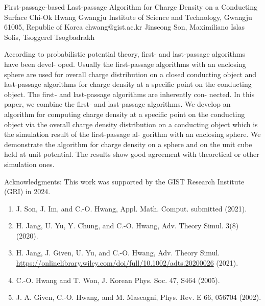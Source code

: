 \begin{talk}
  {First-passage-based Last-passage Algorithm 
   for Charge Density on a Conducting Surface}%
  {Chi-Ok Hwang}%
  {Gwangju Institute of Science and Technology, Gwangju 61005, Republic of Korea }%
  {chwang@gist.ac.kr}%
  {Jinseong Son, Maximiliano Islas Solis, Tsoggerel Tsogbadrakh}%
  
    
   
According to probabilistic potential theory, first- and last-passage algorithms have been devel-
oped. Usually the first-passage algorithms with an enclosing sphere are used for overall charge
distribution on a closed conducting object and last-passage algorithms for charge density at a
specific point on the conducting object. The first- and last-passage algorithms are inherently con-
nected. In this paper, we combine the first- and last-passage algorithms. We develop an algorithm
for computing charge density at a specific point on the conducting object via the overall charge
density distribution on a conducting object which is the simulation result of the first-passage al-
gorithm with an enclosing sphere. We demonstrate the algorithm for charge density on a sphere
and on the unit cube held at unit potential. The results show good agreement with theoretical or
other simulation ones.


\medskip

Acknowledgments: This work was supported by the GIST Research Institute (GRI) in 2024.
\begin{enumerate}
 \item[{[1]}] J. Son, J. Im, and C.-O. Hwang, Appl. Math. Comput. submitted (2021).
 \item[{[2]}] H. Jang, U. Yu, Y. Chung, and C.-O. Hwang, Adv. Theory Simul. 3(8) (2020).
  \item[{[3]}] H. Jang, J. Given, U. Yu, and C.-O. Hwang, Adv. Theory Simul.\hfill\break
   \href{https://onlinelibrary.wiley.com/doi/full/10.1002/adts.202000268}{https://onlinelibrary.wiley.com/doi/full/10.1002/adts.20200026} (2021).
 \item[{[4]}] C.-O. Hwang and T. Won, J. Korean Phys. Soc. 47, S464 (2005).
 \item[{[5]}] J. A. Given, C.-O. Hwang, and M. Mascagni, Phys. Rev. E 66, 056704 (2002).
\end{enumerate}


\end{talk}
